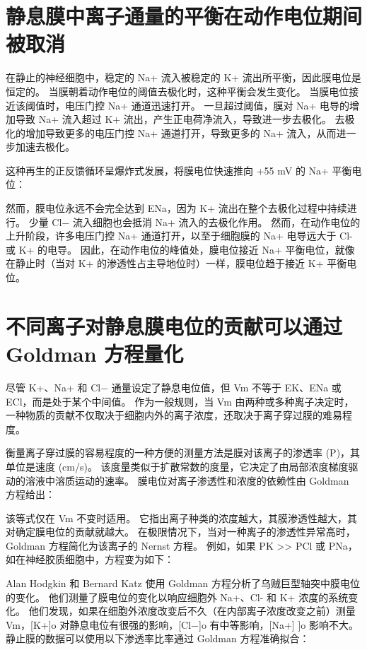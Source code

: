\section{静息膜中离子通量的平衡在动作电位期间被取消}

在静止的神经细胞中，稳定的 Na+ 流入被稳定的 K+ 流出所平衡，因此膜电位是恒定的。 
当膜朝着动作电位的阈值去极化时，这种平衡会发生变化。 
当膜电位接近该阈值时，电压门控 Na+ 通道迅速打开。 
一旦超过阈值，膜对 Na+ 电导的增加导致 Na+ 流入超过 K+ 流出，产生正电荷净流入，导致进一步去极化。 
去极化的增加导致更多的电压门控 Na+ 通道打开，导致更多的 Na+ 流入，从而进一步加速去极化。


这种再生的正反馈循环呈爆炸式发展，将膜电位快速推向 +55 mV 的 Na+ 平衡电位：

然而，膜电位永远不会完全达到 ENa，因为 K+ 流出在整个去极化过程中持续进行。 
少量 Cl− 流入细胞也会抵消 Na+ 流入的去极化作用。 
然而，在动作电位的上升阶段，许多电压门控 Na+ 通道打开，以至于细胞膜的 Na+ 电导远大于 Cl- 或 K+ 的电导。 
因此，在动作电位的峰值处，膜电位接近 Na+ 平衡电位，就像在静止时（当对 K+ 的渗透性占主导地位时）一样，膜电位趋于接近 K+ 平衡电位。


\section{不同离子对静息膜电位的贡献可以通过 Goldman 方程量化}
尽管 K+、Na+ 和 Cl− 通量设定了静息电位值，但 Vm 不等于 EK、ENa 或 ECl，而是处于某个中间值。 
作为一般规则，当 Vm 由两种或多种离子决定时，一种物质的贡献不仅取决于细胞内外的离子浓度，还取决于离子穿过膜的难易程度。


衡量离子穿过膜的容易程度的一种方便的测量方法是膜对该离子的渗透率 (P)，其单位是速度 (cm/s)。 
该度量类似于扩散常数的度量，它决定了由局部浓度梯度驱动的溶液中溶质运动的速率。 
膜电位对离子渗透性和浓度的依赖性由 Goldman 方程给出：


该等式仅在 Vm 不变时适用。 
它指出离子种类的浓度越大，其膜渗透性越大，其对确定膜电位的贡献就越大。 
在极限情况下，当对一种离子的渗透性异常高时，Goldman 方程简化为该离子的 Nernst 方程。 
例如，如果 PK >> PCl 或 PNa，如在神经胶质细胞中，方程变为如下：


Alan Hodgkin 和 Bernard Katz 使用 Goldman 方程分析了乌贼巨型轴突中膜电位的变化。 
他们测量了膜电位的变化以响应细胞外 Na+、Cl- 和 K+ 浓度的系统变化。 
他们发现，如果在细胞外浓度改变后不久（在内部离子浓度改变之前）测量 Vm，[K+]o 对静息电位有很强的影响，[Cl−]o 有中等影响，[Na+] ]o 影响不大。 
静止膜的数据可以使用以下渗透率比率通过 Goldman 方程准确拟合：


